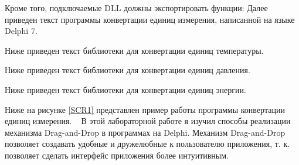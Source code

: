 Кроме того, подключаемые DLL должны экспортировать функции:
\clearpage
{}
Далее приведен текст программы конвертации единиц измерения, написанной на языке Delphi 7.

Ниже приведен текст библиотеки для конвертации единиц температуры.

Ниже приведен текст библиотеки для конвертации единиц давления.

Ниже приведен текст библиотеки для конвертации единиц энергии.

\clearpage

Ниже на рисунке \ref{SCR1} представлен пример работы программы конвертации единиц измерения.
\ 
В этой лабораторной работе я изучил способы реализации механизма Drag-and-Drop в программах на Delphi. Механизм  Drag-and-Drop позволяет создавать удобные и дружелюбные к пользователю приложения, т. к. позволяет сделать интерфейс приложения более интуитивным.

